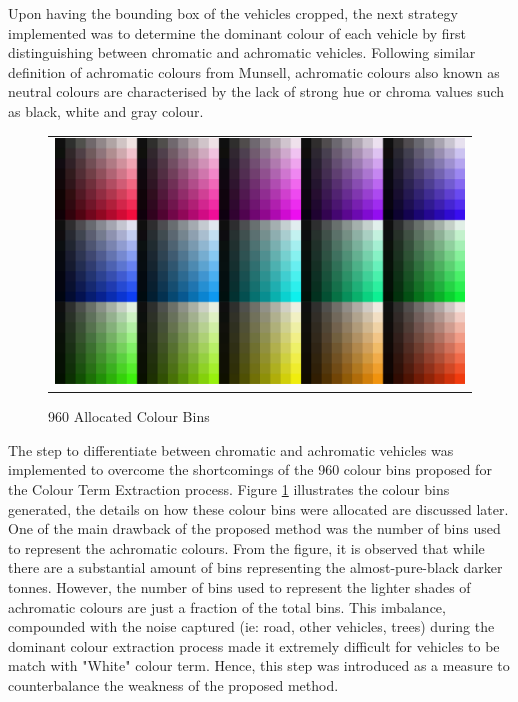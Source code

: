 Upon having the bounding box of the vehicles cropped, the next strategy implemented was to determine the dominant colour of each vehicle by first distinguishing between chromatic and achromatic vehicles. Following similar definition of achromatic colours from Munsell, achromatic colours also known as neutral colours are characterised by the lack of strong hue or chroma values such as black, white and gray colour.

\begin{figure}[htb!]
  \centering
\begin{tabular}{c}
 \includegraphics[width=0.7\linewidth]{image/retrievalOne/all.png} \\
\end{tabular}
\caption{960 Allocated Colour Bins} \label{fig:hsvAllocated}
\end{figure}

The step to differentiate between chromatic and achromatic vehicles was implemented to overcome the shortcomings of the 960 colour bins proposed for the Colour Term Extraction process. Figure \ref{fig:hsvAllocated} illustrates the colour bins generated, the details on how these colour bins were allocated are discussed later. One of the main drawback of the proposed method was the number of bins used to represent the achromatic colours. From the figure, it is observed that while there are a substantial amount of bins representing the almost-pure-black darker tonnes. However, the number of bins used to represent the lighter shades of achromatic colours are just a fraction of the total bins.
This imbalance, compounded with the noise captured (ie: road, other vehicles, trees) during the dominant colour extraction process made it extremely difficult for vehicles to be match with "White" colour term. Hence, this step was introduced as a measure to counterbalance the weakness of the proposed method.


